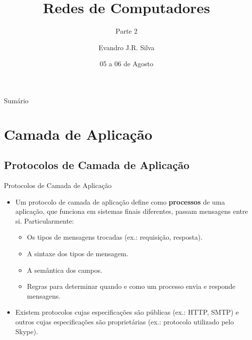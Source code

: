 \documentclass{libs/ufc_format}
\title[ML]{\huge\textbf{Redes de Computadores}}
\subtitle{Parte 2}
\author{Evandro J.R. Silva}
\institute[Estácio Teresina]{
    \normalsize{\email{ejrs.profissional@gmail.com}}
    \newline
    \department{Bacharelado em Ciência da Computação}
    \newline
    \estaciothe
}
\date{05 a 06 de Agosto}
\begin{document}


\begin{frame}{}
    \maketitle
\end{frame}

\begin{frame}{Sumário}
    \begin{multicols}{2}
        \tableofcontents
    \end{multicols}
\end{frame}

\section{Camada de Aplicação}

\subsection{Protocolos de Camada de Aplicação}

\begin{frame}{Protocolos de Camada de Aplicação}
    \begin{itemize}
        \justifying
        \item Um protocolo de camada de aplicação define como \textbf{processos} de uma aplicação, que funciona em sistemas finais diferentes, passam mensagens entre si. Particularmente:
            \begin{itemize}
                \justifying
                \item Os tipos de mensagens trocadas (ex.: requisição, resposta).
                \item A sintaxe dos tipos de mensagem.
                \item A semântica dos campos.
                \item Regras para determinar quando e como um processo envia e responde mensagens.
            \end{itemize}
        \item<2-> Existem protocolos cujas especificações são públicas (ex.: HTTP, SMTP) e outros cujas especificações são proprietárias (ex.: protocolo utilizado pelo Skype).
    \end{itemize}
\end{frame}
\end{document}
